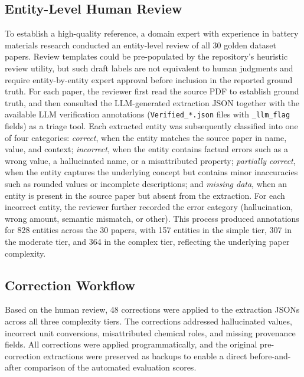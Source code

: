 \documentclass[12pt,a4paper]{article}
\begin{document}
\subsection{Entity-Level Human Review}
\label{sec:review}

To establish a high-quality reference, a domain expert with experience in battery materials research conducted an entity-level review of all 30 golden dataset papers. Review templates could be pre-populated by the repository's heuristic review utility, but such draft labels are not equivalent to human judgments and require entity-by-entity expert approval before inclusion in the reported ground truth. For each paper, the reviewer first read the source PDF to establish ground truth, and then consulted the LLM-generated extraction JSON together with the available LLM verification annotations (\texttt{Verified\_*.json} files with \texttt{\_llm\_flag} fields) as a triage tool. Each extracted entity was subsequently classified into one of four categories: \textit{correct}, when the entity matches the source paper in name, value, and context; \textit{incorrect}, when the entity contains factual errors such as a wrong value, a hallucinated name, or a misattributed property; \textit{partially correct}, when the entity captures the underlying concept but contains minor inaccuracies such as rounded values or incomplete descriptions; and \textit{missing data}, when an entity is present in the source paper but absent from the extraction. For each incorrect entity, the reviewer further recorded the error category (hallucination, wrong amount, semantic mismatch, or other). This process produced annotations for 828 entities across the 30 papers, with 157 entities in the simple tier, 307 in the moderate tier, and 364 in the complex tier, reflecting the underlying paper complexity.

\subsection{Correction Workflow}
\label{sec:corrections}

Based on the human review, 48 corrections were applied to the extraction JSONs across all three complexity tiers. The corrections addressed hallucinated values, incorrect unit conversions, misattributed chemical roles, and missing provenance fields. All corrections were applied programmatically, and the original pre-correction extractions were preserved as backups to enable a direct before-and-after comparison of the automated evaluation scores.
\end{document}
